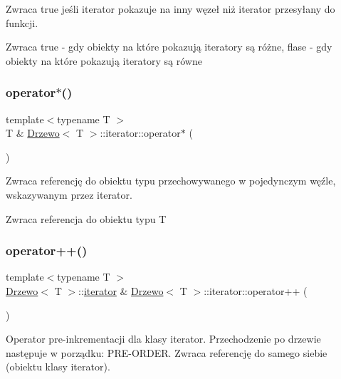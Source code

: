 Zwraca \textquotesingle{}true\textquotesingle{} jeśli iterator pokazuje na inny węzeł niż iterator przesyłany do funkcji.

\begin{DoxyReturn}{Zwraca}
true -\/ gdy obiekty na które pokazują iteratory są różne, flase -\/ gdy obiekty na które pokazują iteratory są równe 
\end{DoxyReturn}
\mbox{\label{class_drzewo_1_1iterator_ab2ee76d0390832e9bed32a829f08f328}} 
\subsubsection{\texorpdfstring{operator$\ast$()}{operator*()}}
{\footnotesize\ttfamily template$<$typename T $>$ \\
T \& \hyperlink{class_drzewo}{Drzewo}$<$ T $>$\+::iterator\+::operator$\ast$ (\begin{DoxyParamCaption}{ }\end{DoxyParamCaption})\hspace{0.3cm}{\ttfamily [inline]}}

Zwraca referencję do obiektu typu przechowywanego w pojedynczym węźle, wskazywanym przez iterator.

\begin{DoxyReturn}{Zwraca}
referencja do obiektu typu T 
\end{DoxyReturn}
\mbox{\label{class_drzewo_1_1iterator_a8b67f4409ee4532a89e745744ba6f8b3}} 
\subsubsection{\texorpdfstring{operator++()}{operator++()}}
{\footnotesize\ttfamily template$<$typename T $>$ \\
\hyperlink{class_drzewo}{Drzewo}$<$ T $>$\+::\hyperlink{class_drzewo_1_1iterator}{iterator} \& \hyperlink{class_drzewo}{Drzewo}$<$ T $>$\+::iterator\+::operator++ (\begin{DoxyParamCaption}{ }\end{DoxyParamCaption})}

Operator pre-\/inkrementacji dla klasy iterator. Przechodzenie po drzewie następuje w porządku\+: P\+R\+E-\/\+O\+R\+D\+ER. Zwraca referencję do samego siebie (obiektu klasy iterator).

